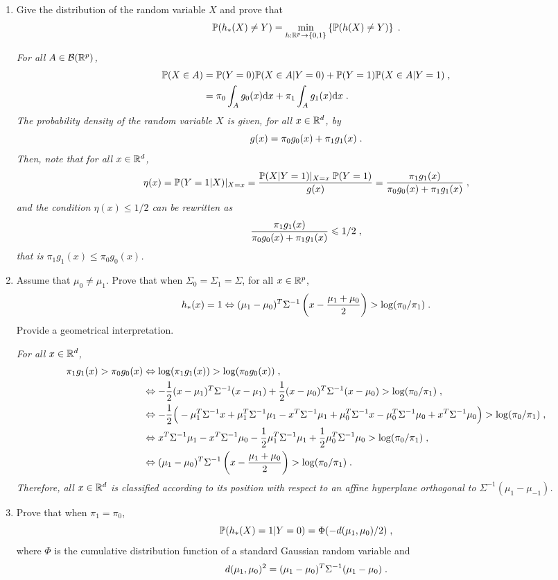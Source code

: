 \begin{enumerate}
\item Give the distribution of the random variable $X$ and prove that 
\[
\mathbb{P}(h_{*}(X)\neq Y)=\min_{h:\mathbb{R}^p\to \{0,1\}}\left\{\mathbb{P}(h(X)\neq Y)\right\}\;.
\]

\vspace{.2cm}

{\em
For all $A\in \mathcal{B}(\mathbb{R}^p)$,
\begin{align*}
\mathbb{P}(X \in A) & = \mathbb{P} (Y = 0) \mathbb{P}(X \in A | Y=0) + \mathbb{P} (Y = 1) \mathbb{P}(X \in A | Y=1)\;, \\
& = \pi_0 \int_A g_0 (x)\mathrm{d} x + \pi_1 \int_A g_1(x)\mathrm{d} x\;.
\end{align*}
The probability density of the random variable $X$ is given, for all $x\in\mathbb{R}^d$, by
\[
g(x) = \pi_0 g_0 (x) + \pi_1  g_1(x)\;.
\]
Then, note that for all $x\in\mathbb{R}^d$,
\begin{align*}
\eta(x) = \mathbb{P}(Y=1|X)|_{X=x} = \frac{\mathbb{P}(X| Y=1)|_{X=x}\; \mathbb{P}(Y=1)}{g(x)} =  \frac{\pi_1 g_1(x)}{\pi_0 g_0(x) + \pi_1 g_1(x)}\;,
\end{align*}
and the condition $\eta(x) \leqslant 1/2$ can be rewritten as
\[
\frac{\pi_1 g_1(x)}{\pi_0 g_0(x) + \pi_1 g_1(x)} \leqslant 1/2\;,
\]
that is $\pi_1 g_1(x) \leqslant \pi_0 g_0(x)$.
}
\item Assume that  $\mu_0\ne\mu_1$. Prove that when $\Sigma_0=\Sigma_1=\Sigma$, for all $x\in\mathbb{R}^p$,
\[
h_{*}(x) = 1 \Leftrightarrow (\mu_{1}-\mu_{0})^T\Sigma^{-1}\left(x-{\mu_{1}+\mu_{0}\over2}\right)>\log(\pi_{0}/\pi_{1})\;.
\]
Provide a geometrical interpretation.

\vspace{.2cm}

{\em 
For all $x\in\mathbb{R}^d$, 
\begin{align*}
 \pi_1 g_1(x) > \pi_0 g_0(x) &\Leftrightarrow  \log(\pi_1 g_1(x)) > \log(\pi_0 g_0(x))\;,\\
&\Leftrightarrow  -{1\over 2}(x-\mu_1)^T\Sigma^{-1}(x-\mu_1) + {1\over 2}(x-\mu_0)^T\Sigma^{-1}(x-\mu_0) > \log(\pi_0/ \pi_1)\;,\\
&\Leftrightarrow  -{1\over 2}\Big(  -\mu_1^T\Sigma^{-1}x + \mu_1^T\Sigma^{-1}\mu_1  - x^T\Sigma^{-1}\mu_1  +\mu_0^T\Sigma^{-1}x - \mu_0^T\Sigma^{-1}\mu_0 + x^T\Sigma^{-1}\mu_0\Big)> \log(\pi_0/ \pi_1)\;,\\
&\Leftrightarrow x^T\Sigma^{-1}\mu_1 - x^T\Sigma^{-1}\mu_0 - \frac{1}{2} \mu_1^T\Sigma^{-1}\mu_1 + \frac{1}{2} \mu_0^T\Sigma^{-1}\mu_0  > \log(\pi_0/ \pi_1)\;,\\
&\Leftrightarrow  (\mu_1 - \mu_0)^T \Sigma^{-1} \left(x - \frac{\mu_1 + \mu_0}{2}\right)  > \log(\pi_0/ \pi_1)\;.
\end{align*}
Therefore, all $x\in\mathbb{R}^d$ is classified according to its position with respect to an affine hyperplane orthogonal to $\Sigma^{-1}(\mu_1-\mu_{-1})$.
}
\item Prove that when $\pi_{1}=\pi_{0}$, 
\[
\mathbb{P}(h_{*}(X)=1|Y=0)=\Phi(-d(\mu_{1},\mu_{0})/2)\;,
\] 
where $\Phi$ is the cumulative distribution function of a standard Gaussian random variable  and 
\[
d(\mu_{1},\mu_{0})^2=(\mu_{1}-\mu_{0})^T\Sigma^{-1}(\mu_{1}-\mu_{0})\;.
\]


\end{enumerate}
